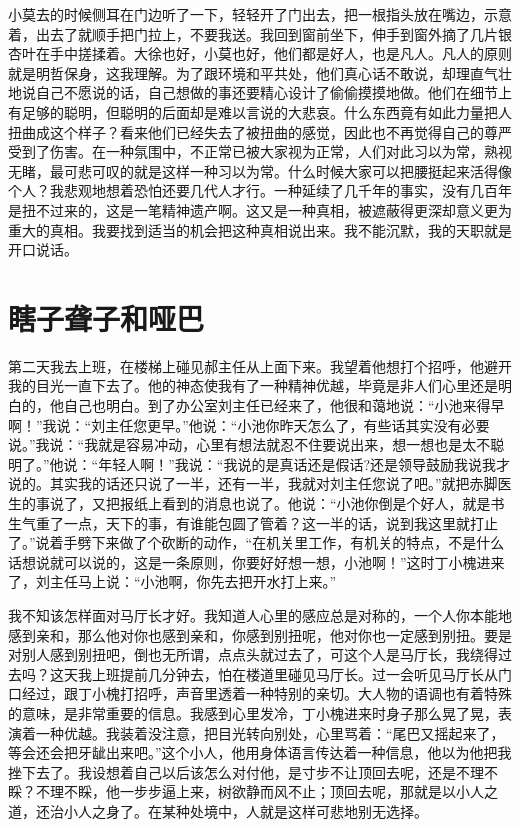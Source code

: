 \documentclass[12pt,oneside]{book}
\begin{document}
小莫去的时候侧耳在门边听了一下，轻轻开了门出去，把一根指头放在嘴边，示意着，出去了就顺手把门拉上，不要我送。我回到窗前坐下，伸手到窗外摘了几片银杏叶在手中搓揉着。大徐也好，小莫也好，他们都是好人，也是凡人。凡人的原则就是明哲保身，这我理解。为了跟环境和平共处，他们真心话不敢说，却理直气壮地说自己不愿说的话，自己想做的事还要精心设计了偷偷摸摸地做。他们在细节上有足够的聪明，但聪明的后面却是难以言说的大悲哀。什么东西竟有如此力量把人扭曲成这个样子？看来他们已经失去了被扭曲的感觉，因此也不再觉得自己的尊严受到了伤害。在一种氛围中，不正常已被大家视为正常，人们对此习以为常，熟视无睹，最可悲可叹的就是这样一种习以为常。什么时候大家可以把腰挺起来活得像个人？我悲观地想着恐怕还要几代人才行。一种延续了几千年的事实，没有几百年是扭不过来的，这是一笔精神遗产啊。这又是一种真相，被遮蔽得更深却意义更为重大的真相。我要找到适当的机会把这种真相说出来。我不能沉默，我的天职就是开口说话。

\chapter{瞎子聋子和哑巴}

第二天我去上班，在楼梯上碰见郝主任从上面下来。我望着他想打个招呼，他避开我的目光一直下去了。他的神态使我有了一种精神优越，毕竟是非人们心里还是明白的，他自己也明白。到了办公室刘主任已经来了，他很和蔼地说：``小池来得早啊！''我说：``刘主任您更早。''他说：``小池你昨天怎么了，有些话其实没有必要说。''我说：``我就是容易冲动，心里有想法就忍不住要说出来，想一想也是太不聪明了。''他说：``年轻人啊！''我说：``我说的是真话还是假话?还是领导鼓励我说我才说的。其实我的话还只说了一半，还有一半，我就对刘主任您说了吧。''就把赤脚医生的事说了，又把报纸上看到的消息也说了。他说：``小池你倒是个好人，就是书生气重了一点，天下的事，有谁能包圆了管着？这一半的话，说到我这里就打止了。''说着手劈下来做了个砍断的动作，``在机关里工作，有机关的特点，不是什么话想说就可以说的，这是一条原则，你要好好想一想，小池啊！''这时丁小槐进来了，刘主任马上说：``小池啊，你先去把开水打上来。''

我不知该怎样面对马厅长才好。我知道人心里的感应总是对称的，一个人你本能地感到亲和，那么他对你也感到亲和，你感到别扭呢，他对你也一定感到别扭。要是对别人感到别扭吧，倒也无所谓，点点头就过去了，可这个人是马厅长，我绕得过去吗？这天我上班提前几分钟去，怕在楼道里碰见马厅长。过一会听见马厅长从门口经过，跟丁小槐打招呼，声音里透着一种特别的亲切。大人物的语调也有着特殊的意味，是非常重要的信息。我感到心里发冷，丁小槐进来时身子那么晃了晃，表演着一种优越。我装着没注意，把目光转向别处，心里骂着：``尾巴又摇起来了，等会还会把牙龇出来吧。''这个小人，他用身体语言传达着一种信息，他以为他把我挫下去了。我设想着自己以后该怎么对付他，是寸步不让顶回去呢，还是不理不睬？不理不睬，他一步步逼上来，树欲静而风不止；顶回去呢，那就是以小人之道，还治小人之身了。在某种处境中，人就是这样可悲地别无选择。
\end{document}
